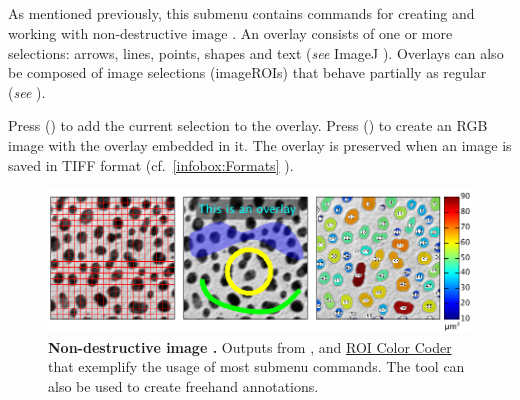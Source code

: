 \subsection{\protect{}\label{sub:Overlay}}

As
mentioned previously, this submenu contains commands for creating
and working with non-destructive image .
An overlay consists of one or more selections: arrows, lines, points,
shapes and text (\emph{see} ImageJ ). Overlays
can also be composed of image selections (imageROIs)
that behave partially as regular  (\emph{see}
).

Press  ()
to add the current selection to the overlay. Press 
 () to create
an RGB image with the overlay embedded in it. The overlay is preserved
when an image is saved in TIFF format (cf.\ \ref{infobox:Formats}
).
\begin{figure}[h]
\noindent \includegraphics[width=0.94\columnwidth]{images/OverlayExamples}\caption[examples]{\textbf{\label{fig:image-overlays}Non-destructive image .
}Outputs from \protect{},
\protect{}
and \protect\href{http://imagejdocu.tudor.lu/doku.php?id=macro:roi_color_coder}{ROI Color Coder}
that exemplify the usage of most \protect{}
submenu commands. The  tool can also be
used to create freehand annotations.}
\end{figure}



